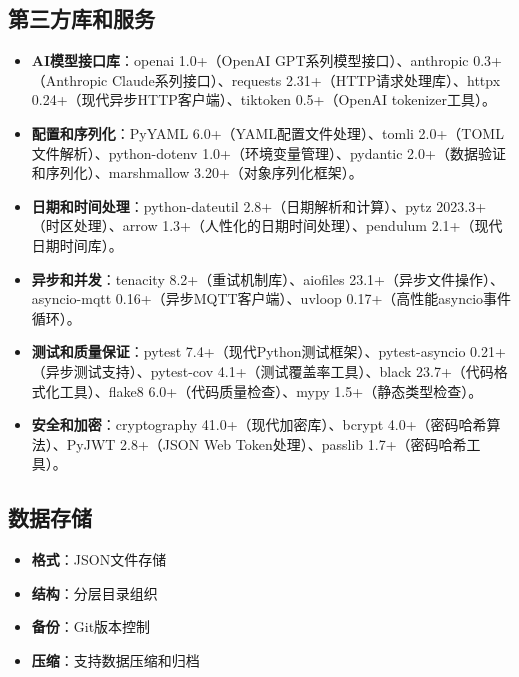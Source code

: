 \documentclass[12pt,a4paper]{article}
\begin{document}
\subsection{第三方库和服务}
\begin{itemize}
    \item \textbf{AI模型接口库}：openai 1.0+（OpenAI GPT系列模型接口）、anthropic 0.3+（Anthropic Claude系列接口）、requests 2.31+（HTTP请求处理库）、httpx 0.24+（现代异步HTTP客户端）、tiktoken 0.5+（OpenAI tokenizer工具）。
    
    \item \textbf{配置和序列化}：PyYAML 6.0+（YAML配置文件处理）、tomli 2.0+（TOML文件解析）、python-dotenv 1.0+（环境变量管理）、pydantic 2.0+（数据验证和序列化）、marshmallow 3.20+（对象序列化框架）。
    
    \item \textbf{日期和时间处理}：python-dateutil 2.8+（日期解析和计算）、pytz 2023.3+（时区处理）、arrow 1.3+（人性化的日期时间处理）、pendulum 2.1+（现代日期时间库）。
    
    \item \textbf{异步和并发}：tenacity 8.2+（重试机制库）、aiofiles 23.1+（异步文件操作）、asyncio-mqtt 0.16+（异步MQTT客户端）、uvloop 0.17+（高性能asyncio事件循环）。
    
    \item \textbf{测试和质量保证}：pytest 7.4+（现代Python测试框架）、pytest-asyncio 0.21+（异步测试支持）、pytest-cov 4.1+（测试覆盖率工具）、black 23.7+（代码格式化工具）、flake8 6.0+（代码质量检查）、mypy 1.5+（静态类型检查）。
    
    \item \textbf{安全和加密}：cryptography 41.0+（现代加密库）、bcrypt 4.0+（密码哈希算法）、PyJWT 2.8+（JSON Web Token处理）、passlib 1.7+（密码哈希工具）。
\end{itemize}

\subsection{数据存储}
\begin{itemize}
    \item \textbf{格式}：JSON文件存储
    \item \textbf{结构}：分层目录组织
    \item \textbf{备份}：Git版本控制
    \item \textbf{压缩}：支持数据压缩和归档
\end{itemize}
\end{document}
